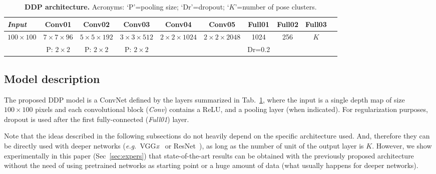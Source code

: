 \documentclass[review,12pt,3p]{elsarticle}
\def \eg{\textit{e.g.}}
\begin{document}
\begin{table}[t]
\caption{\textbf{DDP architecture.} Acronyms: `P'=pooling size; `Dr'=dropout; `$K$'=number of pose clusters. }
\label{tab:cnnarch}
\footnotesize
\begin{center}
\setlength{\tabcolsep}{0.2em} %
\begin{tabular}{|l|c|c|c|c|c|c|c|c|c|}
\hline 
\textit{Input} & Conv01 & Conv02 & Conv03 & Conv04 & Conv05 &Full01 & Full02 & Full03\\ 
\hline \hline
$100 \times 100$ & $7 \times 7  \times 96$ & $5 \times 5 \times 192$ & $3 \times 3 \times 512$ & $2 \times 2 \times 1024$ & $2 \times 2 \times 2048$ & 1024 & 256 & $K$\\
 & P: $2\times 2$ & P: $2\times 2$ & P: $2\times 2$ &  & & Dr=0.2  & & \\
\hline 
\end{tabular} 
\end{center}
\end{table}

\subsection{Model description}\label{subsec:archit}
%

The proposed DDP model is a ConvNet defined by the layers summarized in Tab.~\ref{tab:cnnarch}, where the input is a single depth map of size $100\times 100$ pixels and each convolutional block (\textit{Conv}) contains a ReLU, and a pooling layer (when indicated). For regularization purposes, dropout is used after the first fully-connected (\textit{Full01}) layer.


Note that the ideas described in the following subsections do not heavily depend on the specific architecture used. And, therefore they can be directly used with deeper networks (\eg~VGG\textit{x}~\cite{simonyan2014very} or ResNet~\cite{he2016resnet}), as long as the number of unit of the output layer is $K$. However, we show experimentally in this paper (Sec~\ref{sec:expers}) that state-of-the-art results can be obtained with the previously proposed architecture without the need of using pretrained networks as starting point or a huge amount of data (what usually happens for deeper networks).
\end{document}
